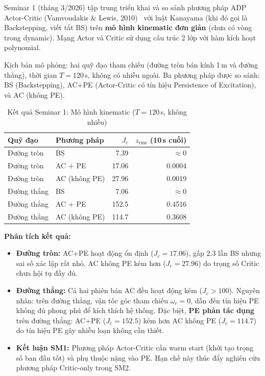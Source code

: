\documentclass[12pt,a4paper]{article}
\begin{document}
Seminar 1 (tháng 3/2026) tập trung triển khai và so sánh phương pháp ADP Actor-Critic (Vamvoudakis \& Lewis, 2010)~\cite{Vamvoudakis2010} với luật Kanayama (khi đó gọi là Backstepping, viết tắt BS) trên \textbf{mô hình kinematic đơn giản} (chưa có vòng trong dynamic). Mạng Actor và Critic sử dụng cấu trúc 2 lớp với hàm kích hoạt polynomial.

Kịch bản mô phỏng: hai quỹ đạo tham chiếu (đường tròn bán kính 1\,m và đường thẳng), thời gian $T = 120$\,s, không có nhiễu ngoài. Ba phương pháp được so sánh: BS (Backstepping), AC+PE (Actor-Critic có tín hiệu Persistence of Excitation), và AC (không PE).

\begin{table}[H]
\centering
\caption{Kết quả Seminar 1: Mô hình kinematic ($T=120$\,s, không nhiễu)}
\begin{tabular}{llrr}
\toprule
\textbf{Quỹ đạo} & \textbf{Phương pháp} & $J_c$ & $z_\text{rms}$ (10\,s cuối) \\
\midrule
Đường tròn & BS          & 7.39  & $\approx 0$ \\
Đường tròn & AC + PE     & 17.06 & 0.0004 \\
Đường tròn & AC (không PE)  & 27.96 & 0.0019 \\
\midrule
Đường thẳng & BS          & 7.06  & $\approx 0$ \\
Đường thẳng & AC + PE     & 152.5 & 0.4516 \\
Đường thẳng & AC (không PE)  & 114.7 & 0.3608 \\
\bottomrule
\end{tabular}
\end{table}

\textbf{Phân tích kết quả:}
\begin{itemize}
    \item \textbf{Đường tròn:} AC+PE hoạt động ổn định ($J_c = 17.06$), gấp 2.3 lần BS nhưng sai số xác lập rất nhỏ. AC không PE kém hơn ($J_c = 27.96$) do trọng số Critic chưa hội tụ đầy đủ.

    \item \textbf{Đường thẳng:} Cả hai phiên bản AC đều hoạt động kém ($J_c > 100$). Nguyên nhân: trên đường thẳng, vận tốc góc tham chiếu $\omega_r = 0$, dẫn đến tín hiệu PE không đủ phong phú để kích thích hệ thống. Đặc biệt, \textbf{PE phản tác dụng} trên đường thẳng: AC+PE ($J_c = 152.5$) kém hơn AC không PE ($J_c = 114.7$) do tín hiệu PE gây nhiễu loạn không cần thiết.

    \item \textbf{Kết luận SM1:} Phương pháp Actor-Critic cần warm start (khởi tạo trọng số ban đầu tốt) và phụ thuộc nặng vào PE. Hạn chế này thúc đẩy nghiên cứu phương pháp Critic-only trong SM2.
\end{itemize}
\end{document}
